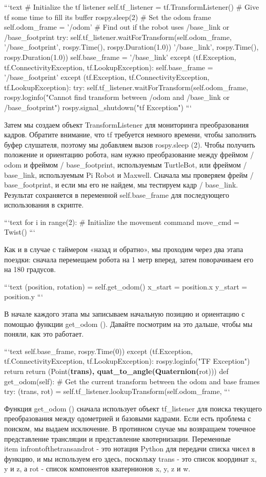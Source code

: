 ```text
# Initialize the tf listener
self.tf_listener = tf.TransformListener()
# Give tf some time to fill its buffer
rospy.sleep(2)
# Set the odom frame
self.odom_frame = '/odom'
# Find out if the robot uses /base_link or /base_footprint
try:
self.tf_listener.waitForTransform(self.odom_frame,
'/base_footprint', rospy.Time(), rospy.Duration(1.0))
'/base_link', rospy.Time(), rospy.Duration(1.0))
self.base_frame = '/base_link'
except (tf.Exception, tf.ConnectivityException, tf.LookupException):
self.base_frame = '/base_footprint'
except (tf.Exception, tf.ConnectivityException, tf.LookupException):
try: self.tf_listener.waitForTransform(self.odom_frame,
rospy.loginfo("Cannot find transform between /odom and /base_link or /base_footprint")
rospy.signal_shutdown("tf Exception")
```

Затем мы создаем объект TransformListener для мониторинга преобразования кадров. Обратите внимание, что tf требуется немного времени, чтобы заполнить буфер слушателя, поэтому мы добавляем вызов rospy.sleep (2). Чтобы получить положение и ориентацию робота, нам нужно преобразование между фреймом / odom и фреймом / base\_footprint, используемым TurtleBot, или фреймом / base\_link, используемым Pi Robot и Maxwell. Сначала мы проверяем фрейм / base\_footprint, и если мы его не найдем, мы тестируем кадр / base\_link. Результат сохраняется в переменной self.base\_frame для последующего использования в скрипте.

```text
for i in range(2):
# Initialize the movement command 
move_cmd = Twist()
```

Как и в случае с таймером «назад и обратно», мы проходим через два этапа поездки: сначала перемещаем робота на 1 метр вперед, затем поворачиваем его на 180 градусов.

```text
(position, rotation) = self.get_odom()
x_start = position.x
y_start = position.y
```

В начале каждого этапа мы записываем начальную позицию и ориентацию с помощью функции get\_odom (). Давайте посмотрим на это дальше, чтобы мы поняли, как это работает.

```text
self.base_frame, rospy.Time(0))
except (tf.Exception, tf.ConnectivityException, tf.LookupException): rospy.loginfo("TF Exception")
return
return (Point(\textbf{trans), quat_to_angle(Quaternion(}rot)))
def get_odom(self):
# Get the current transform between the odom and base frames try:
(trans, rot) = self.tf_listener.lookupTransform(self.odom_frame,
```

\begin{itemize} 
Функция get\_odom () сначала использует объект tf\_listener для поиска текущего преобразования между одометрией и базовыми кадрами. Если есть проблема с поиском, мы выдаем исключение. В противном случае мы возвращаем точечное представление трансляции и представление квотернизации. Переменные \\item { infrontofthetransandrot - это нотация Python для передачи списка чисел в функцию, и мы используем его здесь, поскольку trans - это список координат x, y и z, а rot - список компонентов кватернионов x, y, z и w.} 
\end{itemize} 

